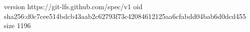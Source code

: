 version https://git-lfs.github.com/spec/v1
oid sha256:d0c7cee514bdcb43aab2c62793f73c42084612125aa6cfabdd04bab6d0dcd455
size 1196
